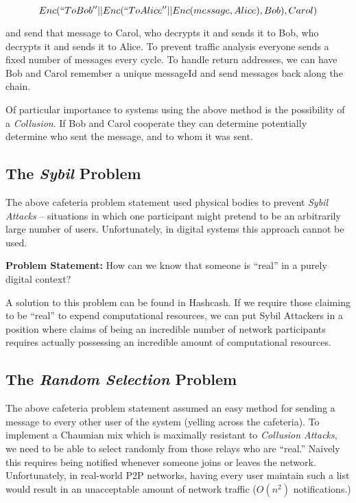 $$Enc(``To Bob'' || Enc(``To Alice'' || Enc(message, Alice), Bob), Carol)$$

and send that message to Carol, who decrypts it and sends it to Bob,
who decrypts it and sends it to Alice. To prevent traffic analysis
everyone sends a fixed number of messages every cycle.  To handle
return addresses, we can have Bob and Carol remember a unique
messageId and send messages back along the chain.

Of particular importance to systems using the above method is the
possibility of a \emph{Collusion}. If Bob and Carol cooperate they can
determine potentially determine who sent the message, and to whom it
was sent.

\subsection{The \emph{Sybil} Problem}

The above cafeteria problem statement used physical bodies to
prevent \emph{Sybil Attacks} -- situations in which one participant
might pretend to be an arbitrarily large number of
users. Unfortunately, in digital systems this approach cannot be used.

\textbf{Problem Statement:} How can we know that someone is ``real''
in a purely digital context?

A solution to this problem can be found in Hashcash\cite{CHORD}. If we
require those claiming to be ``real'' to expend computational
resources, we can put Sybil Attackers in a position where claims of
being an incredible number of network participants requires actually
possessing an incredible amount of computational resources.

\subsection{The \emph{Random Selection} Problem}

The above cafeteria problem statement assumed an easy method for
sending a message to every other user of the system (yelling across
the cafeteria). To implement a Chaumian mix which is maximally
resistant to \emph{Collusion Attacks}, we need to be able to select
randomly from those relays who are ``real.'' Naively this requires
being notified whenever someone joins or leaves the network.
Unfortunately, in real-world P2P networks, having every user maintain
such a list would result in an unacceptable amount of network traffic
($O(n^2)$ notifications.)

